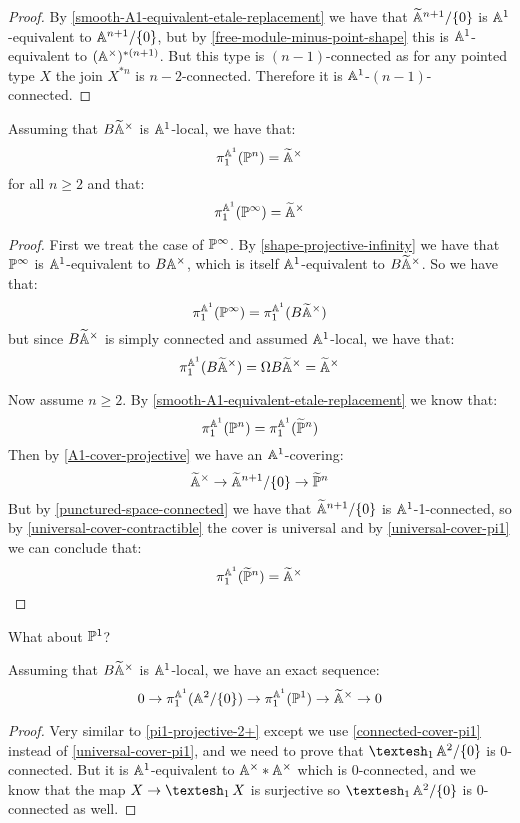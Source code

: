 \begin{proof}
By \cref{smooth-A1-equivalent-etale-replacement} we have that $\widetilde {\mathbb{A}}^{n+1}/\{0\}$ is $\mathbb{A}^1$-equivalent to $\mathbb{A}^{n+1}/\{0\}$, but by \cref{free-module-minus-point-shape} this is $\mathbb{A}^1$-equivalent to $(\mathbb{A}^\times)^{*(n+1)}$. But this type is $(n-1)$-connected as for any pointed type $X$ the join $X^{*n}$ is $n-2$-connected. Therefore it is $\mathbb{A}^1$-$(n-1)$-connected.
\end{proof}

\begin{proposition}\label{pi1-projective-2+}
Assuming that $B\widetilde{\mathbb{A}}^\times$ is $\mathbb{A}^1$-local, we have that:
\[\pi^{\mathbb{A}^1}_1(\mathbb{P}^n) = \widetilde{\mathbb{A}}^\times\]
for all $n\geq 2$ and that:
\[\pi^{\mathbb{A}^1}_1(\mathbb{P}^\infty) = \widetilde{\mathbb{A}}^\times\]
\end{proposition}

\begin{proof}
First we treat the case of $\mathbb{P}^\infty$. By \cref{shape-projective-infinity} we have that $\mathbb{P}^\infty$ is $\mathbb{A}^1$-equivalent to $B\mathbb{A}^\times$, which is itself $\mathbb{A}^1$-equivalent to $B\widetilde{\mathbb{A}}^\times$. So we have that:
\[\pi_1^{\mathbb{A}^1}(\mathbb{P}^\infty) = \pi_1^{\mathbb{A}^1}(B\widetilde{\mathbb{A}}^\times)\]
but since $B\widetilde{\mathbb{A}}^\times$ is simply connected and assumed $\mathbb{A}^1$-local, we have that:
\[\pi_1^{\mathbb{A}^1}(B\widetilde{\mathbb{A}}^\times) = \Omega B\widetilde{\mathbb{A}}^\times = \widetilde{\mathbb{A}}^\times\]

Now assume $n\geq 2$. By \cref{smooth-A1-equivalent-etale-replacement} we know that:
\[\pi_1^{\mathbb{A}^1}(\mathbb{P}^n) = \pi_1^{\mathbb{A}^1}(\widetilde{\mathbb{P}}^n)\]
Then by \cref{A1-cover-projective} we have an $\mathbb{A}^1$-covering: 
\[\widetilde{\mathbb{A}}^\times \to \widetilde {\mathbb{A}}^{n+1}/\{0\} \to \widetilde{\mathbb{P}}^n\]
But by \cref{punctured-space-connected} we have that $\widetilde {\mathbb{A}}^{n+1}/\{0\}$ is $\mathbb{A}^1$-1-connected, so by \cref{universal-cover-contractible} the cover is universal and by \cref{universal-cover-pi1} we can conclude that:
\[\pi_1^{\mathbb{A}^1}(\widetilde{\mathbb{P}}^n) = \widetilde{\mathbb{A}}^\times\]
\end{proof}

What about $\mathbb{P}^1$?

\begin{proposition}
Assuming that $B\widetilde{\mathbb{A}}^\times$ is $\mathbb{A}^1$-local, we have an exact sequence:
\[0\to \pi_1^{\mathbb{A}^1}(\mathbb{A}^2/\{0\}) \to \pi_1^{\mathbb{A}^1}(\mathbb{P}^1) \to \widetilde{\mathbb{A}}^\times\to 0\]
\end{proposition}

\begin{proof}
Very similar to \cref{pi1-projective-2+} except we use \cref{connected-cover-pi1} instead of \cref{universal-cover-pi1}, and we need to prove that $\shape_1\A^2/\{0\}$ is $0$-connected. But it is $\mathbb{A}^1$-equivalent to $\mathbb{A}^\times * \mathbb{A}^\times$ which is $0$-connected, and we know that the map $X\to \shape_1X$ is surjective so $\shape_1\A^2/\{0\}$ is $0$-connected as well.
\end{proof}

 